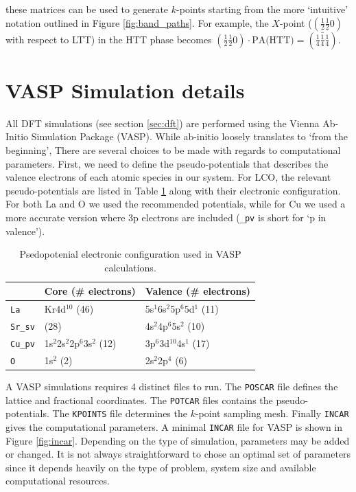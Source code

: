 \noindent these matrices can be used to generate $k$-points starting from the more `intuitive' notation outlined in Figure \ref{fig:band_paths}. For example, the $X$-point ($(\frac{1}{2} \frac{1}{2} 0)$ with respect to LTT) in the HTT phase becomes $(\frac{1}{2} \frac{1}{2} 0) \cdot \text{PA(HTT)} = (\frac{1}{4} \bar{\frac{1}{4}} \frac{1}{4})$.

\section{VASP Simulation details}
All DFT simulations (see section \ref{sec:dft}) are performed using the Vienna Ab-Initio Simulation Package (VASP). While ab-initio loosely translates to `from the beginning', There are several choices to be made with regards to computational parameters. First, we need to define the pseudo-potentials that describes the valence electrons of each atomic species in our system. For LCO, the relevant pseudo-potentials are listed in Table \ref{tab:vasp_pseudo} along with their electronic configuration. For both La and O we used the recommended potentials, while for Cu we used a more accurate version where 3p electrons are included (\verb|_pv| is short for `p in valence').


\begin{table}[b]
\centering
\begin{tabular}{@{}lll@{}}
\toprule
 & Core (\# electrons) & Valence (\# electrons)                        \\ \midrule
\texttt{La}                 & Kr4d$^{10}$ (46)                & 5s$^1$6s$^2$5p$^6$5d$^1$ (11) \\
\texttt{Sr\_sv} & (28) & 4s$^2$4p$^6$5s$^2$ (10) \\
\texttt{Cu\_pv}                 & 1s$^2$2s$^2$2p$^6$3s$^2$ (12) & 3p$^6$3d$^{10}$4s$^1$ (17)      \\
\texttt{O}                  & 1s$^2$ (2)                    & 2s$^2$2p$^4$ (6)              \\ \bottomrule
\end{tabular}
\caption[VASP Pseudopotentials]{Psedopotenial electronic configuration used in VASP calculations.}
\label{tab:vasp_pseudo}
\end{table}

A VASP simulations requires 4 distinct files to run. The \texttt{POSCAR} file defines the lattice and fractional coordinates. The \texttt{POTCAR} files contains the pseudo-potentials. The \texttt{KPOINTS} file determines the $k$-point sampling mesh. Finally \texttt{INCAR} gives the computational parameters. A minimal \texttt{INCAR} file for VASP is shown in Figure \ref{fig:incar}. Depending on the type of simulation, parameters may be added or changed. It is not always straightforward to chose an optimal set of parameters since it depends heavily on the type of problem, system size and available computational resources.

